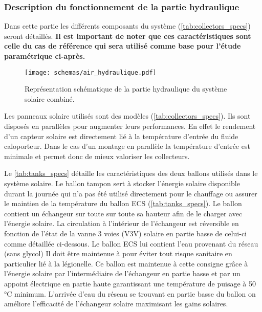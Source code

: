 \subsubsection{Description du fonctionnement de la partie hydraulique} %
\label{ssub:description_du_fonctionnement_de_la_partie_hydraulique}
Dans cette partie les différents composants du système (\autoref{tab:collectors_specs}) seront détaillés.
\textbf{Il est important de noter que ces caractéristiques sont celle du cas de référence
qui sera utilisé comme base pour l’étude paramétrique ci-après.}
\begin{figure}
    \begin{center}
        \texttt{[image: schemas/air\_hydraulique.pdf]}
    \end{center}
    \caption{Représentation schématique de la partie hydraulique du système solaire combiné.
             \label{fig:air_hydraulique}}
\end{figure}

Les panneaux solaire utilisés sont des modèles  (\autoref{tab:collectors_specs}).
Ils sont disposés en parallèles pour augmenter leurs performances. En effet
le rendement d’un capteur solaire est directement lié à la température d’entrée du fluide
caloporteur. Dans le cas d’un montage en parallèle la température d’entrée est minimale
et permet donc de mieux valoriser les collecteurs.

Le \autoref{tab:tanks_specs} détaille les caractéristiques des deux ballons utilisés
dans le système solaire. Le ballon tampon sert à stocker l’énergie solaire disponible
durant la journée qui n’a pas été utilisé directement pour le chauffage ou assurer le maintien
de la température du ballon ECS (\autoref{tab:tanks_specs}). Le ballon contient un échangeur
sur toute sur toute sa hauteur afin de le charger avec l’énergie solaire. La circulation
à l’intérieur de l’échangeur est réversible en fonction de l’état de la vanne 3 voies (V3V)
solaire en partie basse de celui-ci comme détaillée ci-dessous. Le ballon ECS lui contient l’eau
provenant du réseau (sans glycol)
Il doit être maintenue à  pour éviter tout risque sanitaire
en particulier lié à la légionelle. Ce ballon est maintenue à cette consigne grâce à
l’énergie solaire par l’intermédiaire de l’échangeur en partie basse et par un appoint électrique
en partie haute garantissant une température de puisage à 50\,\si{\degreeCelsius} minimum. L’arrivée d’eau
du réseau se trouvant en partie basse du ballon on améliore l’efficacité de l’échangeur solaire
maximisant les gains solaires.

